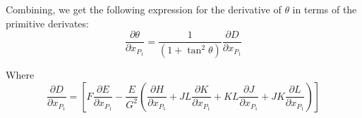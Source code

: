 Combining, we get the following expression for the derivative of
$\theta$ in terms of the primitive derivates:
\begin{displaymath}
  \frac{\partial \theta}{\partial x_{P_1}} = \frac{1}{(1+\tan^2\theta)} \frac{\partial D}{\partial x_{P_1}}
\end{displaymath}

Where 
\begin{displaymath}
  \frac{\partial D}{\partial x_{P_1}} = [F \frac{\partial E}{\partial x_{P_1}} -\frac{E}{G^2} (\frac{\partial H}{\partial x_{P_1}} + JL \frac{\partial K}{\partial x_{P_1}} + KL  \frac{\partial J}{\partial x_{P_1}} + JK  \frac{\partial L}{\partial x_{P_1}})]  
\end{displaymath}







